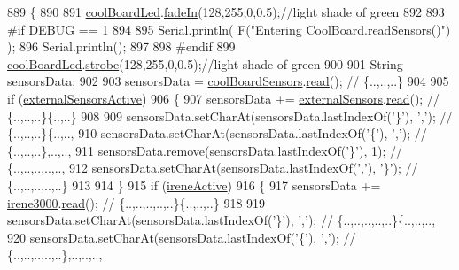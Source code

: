 \begin{DoxyCode}
889 \{
890 
891     \hyperlink{classCoolBoard_a1b1d3c684a5baa56b08486e192fd8e97}{coolBoardLed}.\hyperlink{classCoolBoardLed_ab778f5e7bed0ab74e3906d82110493c3}{fadeIn}(128,255,0,0.5);\textcolor{comment}{//light shade of green}
892                 
893 \textcolor{preprocessor}{#if DEBUG == 1}
894 
895     Serial.println( F(\textcolor{stringliteral}{"Entering CoolBoard.readSensors()"}) );
896     Serial.println();
897 
898 \textcolor{preprocessor}{#endif}
899     \hyperlink{classCoolBoard_a1b1d3c684a5baa56b08486e192fd8e97}{coolBoardLed}.\hyperlink{classCoolBoardLed_ad5f0de4c628cbfbf49896042831c64ad}{strobe}(128,255,0,0.5);\textcolor{comment}{//light shade of green}
900 
901     String sensorsData;
902 
903     sensorsData = \hyperlink{classCoolBoard_af102be5288bd7f7a8e59b13f86e26a00}{coolBoardSensors}.\hyperlink{classCoolBoardSensors_a91badb2539d91fda8679f2a597874c48}{read}(); \textcolor{comment}{// \{..,..,..\}}
904     
905     \textcolor{keywordflow}{if} (\hyperlink{classCoolBoard_a638b00b76aeb819ecfd4c10b8cdd7bb7}{externalSensorsActive})
906     \{
907         sensorsData += \hyperlink{classCoolBoard_a09e26264839c65873eb56af476eff6b2}{externalSensors}.\hyperlink{classExternalSensors_a53177b81eca3be89508b5511ddcd00fc}{read}(); \textcolor{comment}{// \{..,..,..\}\{..,..\}}
908 
909         sensorsData.setCharAt(sensorsData.lastIndexOf(\textcolor{charliteral}{'\}'}), \textcolor{charliteral}{','}); \textcolor{comment}{// \{..,..,..\}\{..,..,}
910         sensorsData.setCharAt(sensorsData.lastIndexOf(\textcolor{charliteral}{'\{'}), \textcolor{charliteral}{','}); \textcolor{comment}{// \{..,..,..\},..,..,}
911         sensorsData.remove(sensorsData.lastIndexOf(\textcolor{charliteral}{'\}'}), 1); \textcolor{comment}{// \{..,..,..,..,..,}
912         sensorsData.setCharAt(sensorsData.lastIndexOf(\textcolor{charliteral}{','}), \textcolor{charliteral}{'\}'}); \textcolor{comment}{// \{..,..,..,..,..\}}
913 
914     \}
915     \textcolor{keywordflow}{if} (\hyperlink{classCoolBoard_a9c3f7ac625481ee2ae802a25d97a4ae0}{ireneActive})
916     \{
917         sensorsData += \hyperlink{classCoolBoard_ad103718ce316006c4695b8eb312eaf11}{irene3000}.\hyperlink{classIrene3000_a852a170feea994ea1df01c6b245b5d9a}{read}(); \textcolor{comment}{// \{..,..,..,..,..\}\{..,..,..\}}
918 
919         sensorsData.setCharAt(sensorsData.lastIndexOf(\textcolor{charliteral}{'\}'}), \textcolor{charliteral}{','}); \textcolor{comment}{// \{..,..,..,..,..\}\{..,..,..,}
920         sensorsData.setCharAt(sensorsData.lastIndexOf(\textcolor{charliteral}{'\{'}), \textcolor{charliteral}{','}); \textcolor{comment}{// \{..,..,..,..,..\},..,..,..,}

\end{DoxyCode}
